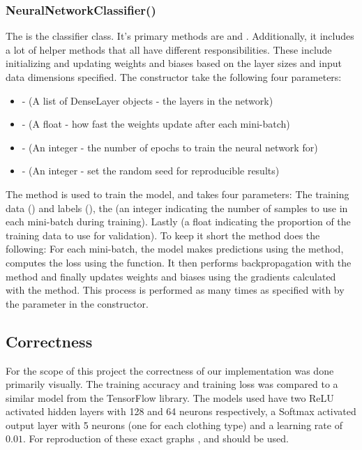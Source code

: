 \subsubsection{NeuralNetworkClassifier()}
The  is the classifier class.
It's primary methods are  and .
Additionally, it includes a lot of helper methods that all have different responsibilities.
These include initializing and updating weights and biases based on the layer sizes and input data dimensions specified.
The constructor take the following four parameters:\\
\begin{itemize}
    \item {} - (A list of DenseLayer objects - the layers in the network)
    \item {} - (A float - how fast the weights update after each mini-batch)
    \item {} - (An integer - the number of epochs to train the neural network for)
    \item {} - (An integer - set the random seed for reproducible results)
    \end{itemize}
\vspace{10pt}


The  method is used to train the model, and takes four parameters:
The training data () and labels (), the  (an integer indicating the number of samples to use in each mini-batch during training).
Lastly  (a float indicating the proportion of the training data to use for validation).
To keep it short the  method does the following:
For each mini-batch, the model makes predictions using the  method, computes the loss using the  function.
It then performs backpropagation with the  method and finally updates weights and biases using the gradients calculated with the  method.
This process is performed as many times as specified with by the  parameter in the constructor.

\subsection{Correctness}
For the scope of this project the correctness of our implementation was done primarily visually.
The training accuracy and training loss was compared to a similar model from the TensorFlow library.
The models used have two ReLU activated hidden layers with 128 and 64 neurons respectively, a Softmax activated output layer with 5 neurons (one for each clothing type) and a learning rate of $0.01$.
For reproduction of these exact graphs , and  should be used. \\

